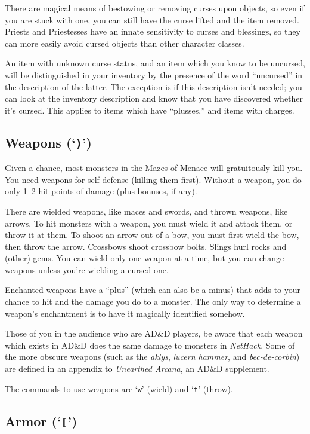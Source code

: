 There are magical means of bestowing or removing curses upon objects,
so even if you are stuck with one, you can still have the curse
lifted and the item removed.  Priests and Priestesses have an innate
sensitivity to curses and blessings, so they can more easily avoid
cursed objects than other character classes.

An item with unknown curse status, and an item which you know to be uncursed,
will be distinguished in your inventory by the presence of the word
``uncursed'' in the description of the latter.  The exception is if this
description isn't needed; you can look at the inventory description and know
that you have discovered whether it's cursed.  This applies to items which
have ``plusses,'' and items with charges.

\subsection*{Weapons (`{\tt )}')}

Given a chance, most monsters in the Mazes of Menace will
gratuitously kill you.  You need weapons for self-defense (killing
them first).  Without a weapon, you do only 1--2 hit points of damage
(plus bonuses, if any).

There are wielded weapons, like maces and swords, and thrown weapons,
like arrows.  To hit monsters with a weapon, you must wield it and
attack them, or throw it at them.  To shoot an arrow out of a bow, you
must first wield the bow, then throw the arrow.  Crossbows shoot
crossbow bolts.  Slings hurl rocks and (other) gems.  You can wield
only one weapon at a time, but you can change weapons unless you're
wielding a cursed one.

Enchanted weapons have a ``plus'' (which can also be a minus)
that adds to your chance to hit and the damage you do to a monster.
The only way to determine a weapon's enchantment
is to have it magically identified somehow.

Those of you in the audience who are AD\&D players, be aware that each
weapon which exists in AD\&D does the same damage to monsters in
{\it NetHack}.  Some of the more obscure weapons (such as the %
{\it aklys}, {\it lucern hammer}, and {\it bec-de-corbin\/}) are defined
in an appendix to {\it Unearthed Arcana}, an AD\&D supplement.

The commands to use weapons are `{\tt w}' (wield) and `{\tt t}' (throw).

\subsection*{Armor (`{\tt [}')}

